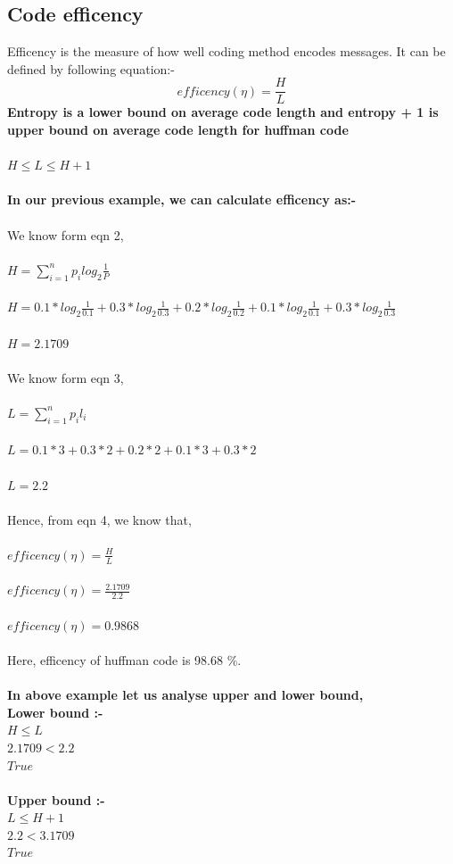 \documentclass[10pt,a4paper]{article}
\begin{document}
\subsection*{Code efficency}
Efficency is the measure of how well coding method encodes messages. It can be defined by following equation:- 
\begin{equation}
efficency (\eta ) =\frac {H}{L}
\end{equation}
\textbf{Entropy is a lower bound on average code length and entropy + 1 is upper bound on average code length for huffman code}\\
\\
$ H\leq L \leq H+1 $ \\
\\
\textbf{In our previous example, we can calculate efficency as:-} \\
\\
We know form eqn 2,\\
\\
$ H = \sum_{i=1}^{n} p_i log_{2} {\frac{1}{P}}$\\
\\
$ H =  0.1 * log_{2} {\frac{1}{0.1}} +  0.3 * log_{2}  {\frac{1}{0.3}} + 0.2 * log_{2}  {\frac{1}{0.2}} + 0.1 * log_{2}{  \frac{1}{0.1}} +  0.3 * log_{2}  {\frac{1}{0.3}}$ \\
\\
$ H = 2.1709$ \\
\\
We know form eqn 3, \\
\\
$L = \sum_{i=1}^{n} p_i l_i$ \\
\\
$ L =  0.1 * 3 +  0.3 * 2 + 0.2 * 2 + 0.1 * 3 +  0.3 * 2$ \\
\\
$ L = 2.2$\\
\\
Hence, from eqn 4, we know that, \\
\\
$ efficency (\eta ) =\frac {H}{L} $ \\
\\
$ efficency (\eta ) =\frac {2.1709}{2.2} $ \\
\\
$ efficency (\eta ) =0.9868 $ \\
\\
Here, efficency of huffman code is 98.68 $ \% $.
\\
\\
\textbf{In above example let us analyse upper and lower bound,} \\
\textbf{Lower bound :-} \\
$H \leq L$ \\
$2.1709 < 2.2 $ \\
$ True $\\
\\
\textbf{Upper bound :-} \\
$L \leq H+1$ \\
$2.2 < 3.1709 $ \\
$ True $\\
\end{document}
